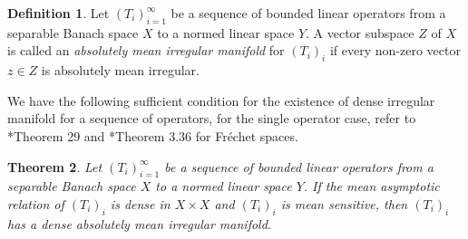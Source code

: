 \documentclass[12pt,a4paper]{amsart}
\theoremstyle{definition}
\newtheorem{defn}{Definition}[section]
\theoremstyle{plain}
\newtheorem{thm}[defn]{Theorem}
\begin{document}
\begin{defn}
    Let $(T_i)_{i=1}^{\infty}$ be a sequence of bounded linear operators from a separable Banach space $X$ to a normed linear space $Y$. A vector subspace $Z$ of $X$ is called an \emph{absolutely mean irregular manifold} for $(T_i)_i$ if every non-zero vector $z\in Z$ is absolutely mean irregular.
\end{defn}

We have the following sufficient condition for the existence of dense irregular manifold for a sequence of operators, for the single operator case, refer to \cite{BBP2020}*{Theorem 29} and \cite{JL2022}*{Theorem 3.36} for Fr\'echet spaces.

\begin{thm}\label{thm:dense-mean-irregular-manifold}
    Let $(T_i)_{i=1}^{\infty}$ be a sequence of bounded linear operators from a separable Banach space $X$ to a normed linear space $Y$.
    If the  mean asymptotic relation of $(T_i)_i$ is dense in $X\times X$ and $(T_i)_i$ is mean sensitive, then $(T_i)_i$ has a dense absolutely mean irregular manifold.
\end{thm}
\end{document}
